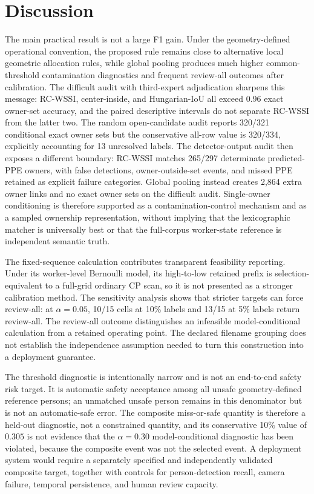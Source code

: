 \documentclass[iicol,pdflatex,sn-mathphys-num]{sn-jnl}
\begin{document}
\section{Discussion}\label{sec:discussion}

The main practical result is not a large F1 gain. Under the geometry-defined operational convention, the proposed rule remains close to alternative local geometric allocation rules, while global pooling produces much higher common-threshold contamination diagnostics and frequent review-all outcomes after calibration. The difficult audit with third-expert adjudication sharpens this message: RC-WSSI, center-inside, and Hungarian-IoU all exceed 0.96 exact owner-set accuracy, and the paired descriptive intervals do not separate RC-WSSI from the latter two. The random open-candidate audit reports 320/321 conditional exact owner sets but the conservative all-row value is 320/334, explicitly accounting for 13 unresolved labels. The detector-output audit then exposes a different boundary: RC-WSSI matches 265/297 determinate predicted-PPE owners, with false detections, owner-outside-set events, and missed PPE retained as explicit failure categories. Global pooling instead creates 2,864 extra owner links and no exact owner sets on the difficult audit. Single-owner conditioning is therefore supported as a contamination-control mechanism and as a sampled ownership representation, without implying that the lexicographic matcher is universally best or that the full-corpus worker-state reference is independent semantic truth.

The fixed-sequence calculation contributes transparent feasibility reporting. Under its worker-level Bernoulli model, its high-to-low retained prefix is selection-equivalent to a full-grid ordinary CP scan, so it is not presented as a stronger calibration method. The sensitivity analysis shows that stricter targets can force review-all: at $\alpha=0.05$, 10/15 cells at 10\% labels and 13/15 at 5\% labels return review-all. The review-all outcome distinguishes an infeasible model-conditional calculation from a retained operating point. The declared filename grouping does not establish the independence assumption needed to turn this construction into a deployment guarantee.

The threshold diagnostic is intentionally narrow and is not an end-to-end safety risk target. It is automatic safety acceptance among all unsafe geometry-defined reference persons; an unmatched unsafe person remains in this denominator but is not an automatic-safe error. The composite miss-or-safe quantity is therefore a held-out diagnostic, not a constrained quantity, and its conservative 10\% value of $0.305$ is not evidence that the $\alpha=0.30$ model-conditional diagnostic has been violated, because the composite event was not the selected event. A deployment system would require a separately specified and independently validated composite target, together with controls for person-detection recall, camera failure, temporal persistence, and human review capacity.
\end{document}

